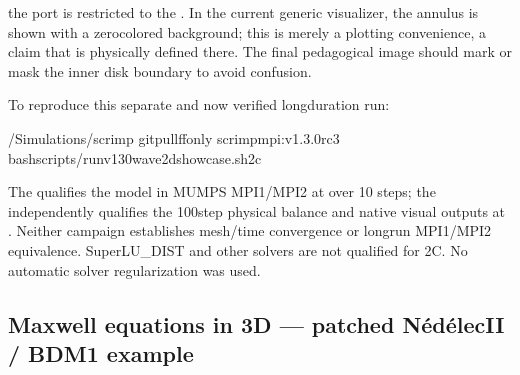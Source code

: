 \documentclass[letterpaper,10pt,english]{sphinxmanual}
\begin{document}
\sphinxAtStartPar
{} the  port is
restricted to the . In the
current generic visualizer, the annulus is shown
with a zero\sphinxhyphen{}colored background; this is merely
a plotting convenience,  a claim that
 is physically defined there. The final
pedagogical image should mark or mask the
inner disk boundary to avoid confusion.

\sphinxAtStartPar
To reproduce this separate and now verified
long\sphinxhyphen{}duration run:

\begin{sphinxVerbatim}[commandchars=\\\{\}]
\PYGZti{}/Simulations/scrimp
gitpull\PYGZhy{}\PYGZhy{}ff\PYGZhy{}only
scrimp\PYGZhy{}mpi:v1.3.0\PYGZhy{}rc3
bashscripts/run\PYGZhy{}v130\PYGZhy{}wave2d\PYGZhy{}showcase.sh2c
\end{sphinxVerbatim}

\sphinxAtStartPar
The  qualifies the model in
MUMPS MPI1/MPI2 at  over 10 steps;
the  independently qualifies the
100\sphinxhyphen{}step physical balance and native visual outputs
at  .
Neither campaign establishes mesh/time convergence
or long\sphinxhyphen{}run MPI1/MPI2 equivalence. SuperLU\_DIST
and other solvers are not qualified for 2C.
No automatic solver regularization was used.

\sphinxstepscope


\subsection{Maxwell equations in 3D — patched Nédélec\sphinxhyphen{}II / BDM1 example}
\label{\detokenize{examples/maxwell_3d:maxwell-equations-in-3d-patched-nedelec-ii-bdm1-example}}\label{\detokenize{examples/maxwell_3d::doc}}
\end{document}

